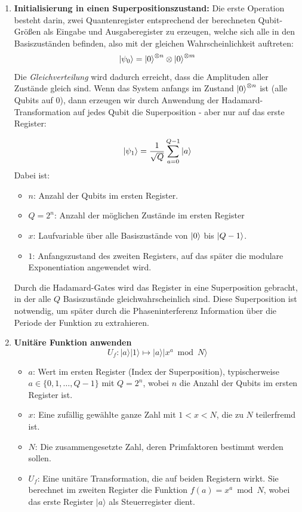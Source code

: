 \begin{enumerate}
    \item \textbf{Initialisierung in einen Superpositionszustand:} 
    Die erste Operation besteht darin, zwei Quantenregister entsprechend der berechneten Qubit-Größen als Eingabe und Ausgaberegister zu erzeugen, welche sich alle in den Basiszuständen befinden, also mit der gleichen Wahrscheinlichkeit auftreten:
\[
\ket{\psi_0} = \ket{0}^{\otimes n} \otimes \ket{0}^{\otimes m}
\]
    Die \textit{Gleichverteilung} wird dadurch erreicht, dass die Amplituden aller Zustände gleich sind. Wenn das System anfangs im Zustand $\ket{0}^{\otimes n}$ ist (alle Qubits auf 0), dann erzeugen wir durch Anwendung der Hadamard-Transformation auf jedes Qubit die Superposition - aber nur auf das erste Register:

$$
\ket{\psi_1} = \frac{1}{\sqrt{Q}} \sum_{a=0}^{Q-1} \ket{a}
$$
Dabei ist:
  \begin{itemize}
    \item \( n \): Anzahl der Qubits im ersten Register.
    \item \( Q = 2^n \): Anzahl der möglichen Zustände im ersten Register
    \item \( x \): Laufvariable über alle Basiszustände von \( \ket{0} \) bis \( \ket{Q-1} \).
    \item \( 1 \): Anfangszustand des zweiten Registers, auf das später die modulare Exponentiation angewendet wird.
  \end{itemize}

  Durch die Hadamard-Gates wird das Register in eine Superposition gebracht, in der alle \( Q \) Basiszustände gleichwahrscheinlich sind. Diese Superposition ist notwendig, um später durch die Phaseninterferenz Information über die Periode der Funktion zu extrahieren.\\
 \item \textbf{Unitäre Funktion anwenden} 
\[
U_f \colon |a\rangle|1\rangle \mapsto |a\rangle|x^a \bmod N\rangle
\]
\begin{itemize}
    \item \textbf{\( a \)}: Wert im ersten Register (Index der Superposition), typischerweise \( a \in \{0, 1, \dotsc, Q-1\} \) mit \( Q = 2^n \), wobei \( n \) die Anzahl der Qubits im ersten Register ist.
    \item \textbf{\( x \)}: Eine zufällig gewählte ganze Zahl mit \( 1 < x < N \), die zu \( N \) teilerfremd ist.
    \item \textbf{\( N \)}: Die zusammengesetzte Zahl, deren Primfaktoren bestimmt werden sollen.
    \item \textbf{\( U_f \)}: Eine unitäre Transformation, die auf beiden Registern wirkt. Sie berechnet im zweiten Register die Funktion \( f(a) = x^a \bmod N \), wobei das erste Register \( |a\rangle \) als Steuerregister dient.
\end{itemize}


\end{enumerate}
